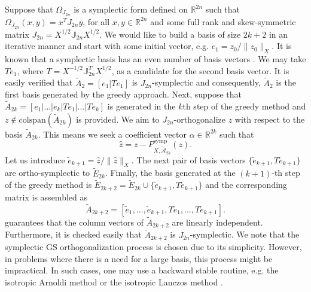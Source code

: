 Suppose that $\Omega_{J_{2n}}$ is a symplectic form defined on $\mathbb R^{2n}$ such that $\Omega_{J_{2n}}(x,y) = x^T J_{2n} y$, for all $x,y\in \mathbb R^{2n}$ and some full rank and skew-symmetric matrix $J_{2n} = X^{1/2} \mathbb J_{2n} X^{1/2}$. We would like to build a basis of size $2k+2$ in an iterative manner and start with some initial vector, e.g. $e_1 = z_0/\| z_0 \|_X$. It is known that a symplectic basis has an even number of basis vectors \cite{Marsden:2010:IMS:1965128}. We may take $Te_1$, where $T = X^{-1/2} \mathbb J_{2n}^{T}X^{1/2}$, as a candidate for the second basis vector. It is easily verified that $\tilde A_2=[e_1|Te_1]$ is $J_{2n}$-symplectic and consequently, $\tilde A_2$ is the first basis generated by the greedy approach. Next, suppose that $\tilde A_{2k} = [e_1|\dots|e_k|Te_1|\dots|Te_k]$ is generated in the $k$th step of the greedy method and $z\not \in \text{colspan}\left(\tilde A_{2k}\right)$ is provided. We aim to $J_{2n}$-orthogonalize $z$ with respect to the basis $\tilde A_{2k}$. This means we seek a coefficient vector $\alpha\in \mathbb R^{2k}$ such that
\begin{equation} \label{eq:normmor.9}
	\hat z = z - P^{\text{symp}}_{X,\tilde{\mathcal A}_{2k}}(z).
\end{equation}
Let us introduce $\tilde e_{k+1} = \hat z / \| \hat z \|_X$. The next pair of basis vectors $\{ \tilde e_{k+1} , T \tilde e_{k+1}\}$ are ortho-symplectic to $\tilde E_{2k}$. Finally, the basis generated at the $(k+1)$-th step of the greedy method is $\tilde E_{2k+2} = \tilde E_{2k}\cup\{ \tilde e_{k+1} , T\tilde e_{k+1}\}$ and the corresponding matrix is assembled as
\begin{equation} \label{eq:normmor.11}
	\tilde A_{2k+2} = [\tilde e_1,\dots,\tilde e_{k+1},T\tilde e_1,\dots,T\tilde e_{k+1}].
\end{equation}
 guarantees that the column vectors of $\tilde A_{2k+2}$ are linearly independent. Furthermore, it is checked easily that $\tilde A_{2k+2}$ is $J_{2n}$-symplectic. We note that the symplectic GS orthogonalization process is chosen due to its simplicity. However, in problems where there is a need for a large basis, this process might be impractical. In such cases, one may use a backward stable routine, e.g. the isotropic Arnoldi method or the isotropic Lanczos method \cite{doi:10.1137/S1064827500366434}.

